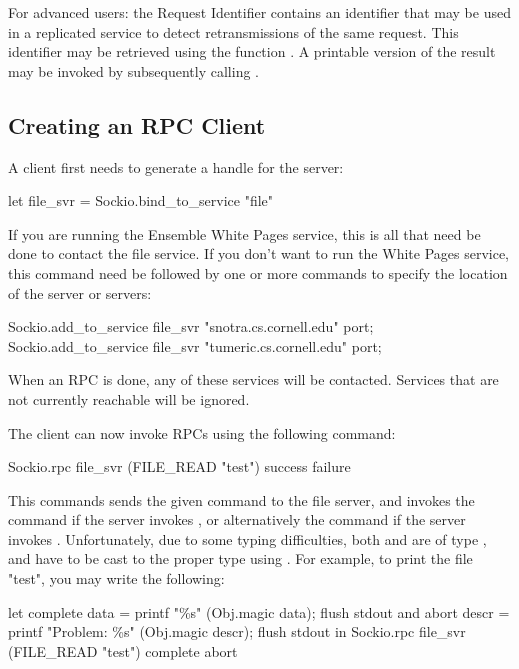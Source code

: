 For advanced users: the Request Identifier contains an identifier that may be used in
a replicated service to detect retransmissions of the same request.  This identifier
may be retrieved using the function .  A printable version
of the result may be invoked by subsequently calling .

\subsection{Creating an RPC Client}

A client first needs to generate a handle for the server:
\begin{codebox}
   let file_svr = Sockio.bind_to_service "file"
\end{codebox}

If you are running the Ensemble White Pages service, this is all that need be done to
contact the file service.  If you don't want to run the White Pages service, this
command need be followed by one or more commands to specify the location of the
server or servers:
\begin{codebox}
   Sockio.add_to_service file_svr "snotra.cs.cornell.edu" port;
   Sockio.add_to_service file_svr "tumeric.cs.cornell.edu" port;
\end{codebox}

When an RPC is done, any of these services will be contacted.  Services that are not
currently reachable will be ignored.

The client can now invoke RPCs using the following command:
\begin{codebox}
  Sockio.rpc file_svr (FILE_READ "test") success failure
\end{codebox}

This commands sends the given command to the file server, and invokes the command
 if the server invokes , or
alternatively the command  if the server invokes
.  Unfortunately, due to some typing difficulties,
both  and  are of type , and have to be
cast to the proper type using .  For example, to print the file
"test", you may write the following:
\begin{codebox}
  let complete data =
    printf "\%s" (Obj.magic data); flush stdout
  and abort descr =
    printf "Problem: \%s" (Obj.magic descr); flush stdout
  in
  Sockio.rpc file_svr (FILE_READ "test") complete abort
\end{codebox}

